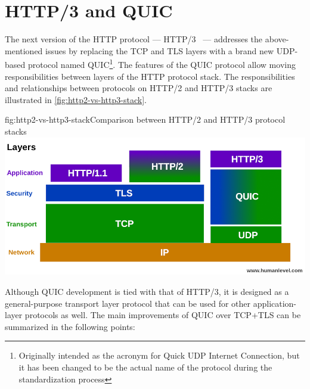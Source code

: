 \section{HTTP/3 and QUIC}

The next version of the HTTP protocol --- HTTP/3~\cite{draft-ietf-quic-http} --- addresses the
above-mentioned issues by replacing the TCP and TLS layers with a brand new UDP-based protocol named
QUIC\footnote{Originally intended as the acronym for Quick UDP Internet Connection, but it has been
changed to be the actual name of the protocol during the standardization process}. The features of
the QUIC protocol allow moving responsibilities between layers of the HTTP protocol stack. The
responsibilities and relationships between protocols on HTTP/2 and HTTP/3 stacks are illustrated in
\autoref{fig:http2-vs-http3-stack}.


\begin{myFigure}{fig:http2-vs-http3-stack}{Comparison between HTTP/2 and HTTP/3 protocol stacks}
  \includegraphics[width=\textwidth]{img/01-pile-http-protocol}
\end{myFigure}


Although QUIC development is tied with that of HTTP/3, it is designed as a general-purpose transport
layer protocol that can be used for other application-layer protocols as well. The main improvements
of QUIC over TCP+TLS can be summarized in the following points:

